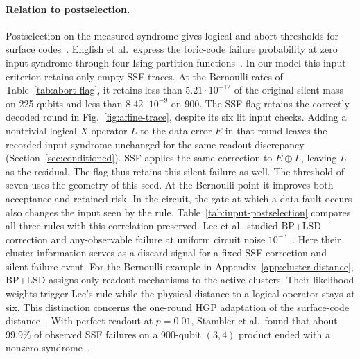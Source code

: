 \documentclass[10pt,twocolumn]{article}
\theoremstyle{definition}
\begin{document}
\paragraph{Relation to postselection.}
Postselection on the measured syndrome gives logical and abort
thresholds for surface codes~\cite{EWB25}. English et al.\ express
the toric-code failure probability at zero input syndrome through
four Ising partition functions~\cite[Sec.~III]{ERBDW26}. In our
model this input criterion retains only empty SSF traces. At the
Bernoulli rates of Table~\ref{tab:abort-flag}, it retains less than
$5.21\cdot10^{-12}$ of the original silent mass on 225 qubits and
less than $8.42\cdot10^{-9}$ on 900.
The SSF flag retains the correctly decoded round in
Fig.~\ref{fig:affine-trace}, despite its six lit input checks.
Adding a nontrivial logical $X$ operator $L$ to the data error $E$
in that round leaves the recorded input syndrome unchanged for the
same readout discrepancy (Section~\ref{sec:conditioned}). SSF applies
the same correction to $E\oplus L$, leaving $L$ as the residual.
The flag thus retains this silent failure as well.
The threshold of seven uses the geometry of this seed. At the Bernoulli
point it improves both acceptance and retained risk. In the circuit,
the gate at which a data fault occurs also changes the input seen by
the rule. Table~\ref{tab:input-postselection} compares all three rules
with this correlation preserved. Lee et al.\ studied BP+LSD correction
and any-observable failure at uniform circuit noise
$10^{-3}$~\cite[Fig.~5]{LEB26}. Here their cluster information serves
as a discard signal for a fixed SSF correction and silent-failure
event. For the Bernoulli example in Appendix~\ref{app:cluster-distance},
BP+LSD assigns only readout mechanisms to the active clusters. Their
likelihood weights trigger Lee's rule while the physical distance to
a logical operator stays at six. This distinction concerns the
one-round HGP adaptation of the surface-code distance~\cite{MPP24}.
With
perfect readout at $p=0.01$, Stambler et al.\ found that about
$99.9\%$ of observed SSF failures on a 900-qubit $(3,4)$ product
ended with a nonzero syndrome~\cite[Table~1]{SKB23}.
\end{document}
